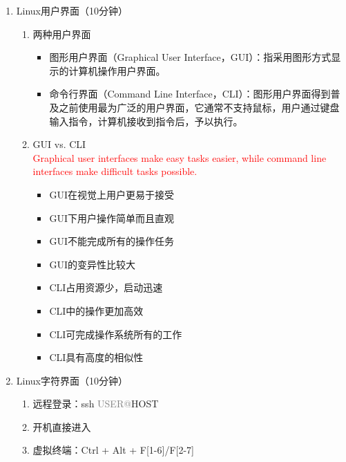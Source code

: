 \documentclass{TIJMUjiaoanSY}
\begin{document}

\firstTail


\newpage
\otherHeader

\noindent
\begin{enumerate}
  \item Linux用户界面（10分钟）
    \begin{enumerate}
      \item 两种用户界面
	\begin{itemize}
	  \item 图形用户界面（Graphical User Interface，GUI）：指采用图形方式显示的计算机操作用户界面。
	  \item 命令行界面（Command Line Interface，CLI）：图形用户界面得到普及之前使用最为广泛的用户界面，它通常不支持鼠标，用户通过键盘输入指令，计算机接收到指令后，予以执行。
	\end{itemize}
      \item GUI vs. CLI\\
	\textcolor{red}{Graphical user interfaces make easy tasks easier, while command line interfaces make difficult tasks possible.}
	\begin{itemize}
	  \item GUI在视觉上用户更易于接受
	  \item GUI下用户操作简单而且直观
	  \item GUI不能完成所有的操作任务
	  \item GUI的变异性比较大
	  \item CLI占用资源少，启动迅速
	  \item CLI中的操作更加高效
	  \item CLI可完成操作系统所有的工作
	  \item CLI具有高度的相似性
	\end{itemize}
    \end{enumerate}
  \item Linux字符界面（10分钟）
    \begin{enumerate}
      \item 远程登录：ssh \textcolor{gray}{USER@}HOST
      \item 开机直接进入
      \item 虚拟终端：Ctrl + Alt + F[1-6]/F[2-7]\\

\end{enumerate}
\end{enumerate}
\end{document}

